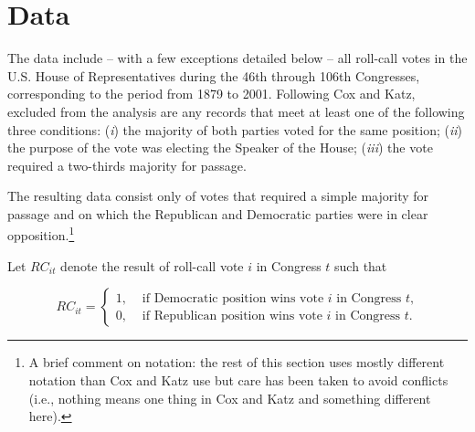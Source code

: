 \section{Data}
\label{ckdata}

The data include -- with a few exceptions detailed below -- all roll-call votes in the U.S. House of Representatives during the 46th through 106th Congresses, corresponding to the period from 1879 to 2001.  Following Cox and Katz, excluded from the analysis are any records that meet at least one of the following three conditions: ({\it i}) the majority of both parties voted for the same position; ({\it ii}) the purpose of the vote was electing the Speaker of the House; ({\it iii}) the vote required a two-thirds majority for passage.

The resulting data consist only of votes that required a simple majority for passage and on which the Republican and Democratic parties were in clear opposition.\footnote{A brief comment on notation: the rest of this section uses mostly different notation than Cox and Katz use but care has been taken to avoid conflicts (i.e., nothing means one thing in Cox and Katz and something different here).}

Let $RC_{it}$ denote the result of roll-call vote $i$ in Congress $t$ such that 

\begin{equation*}
RC_{it} =
\begin{cases} 
1, & \text{ if Democratic position wins vote $i$ in Congress $t$,} \\[10pt]
0, & \text{ if Republican position wins vote $i$ in Congress $t$.}
\end{cases}
\end{equation*}


